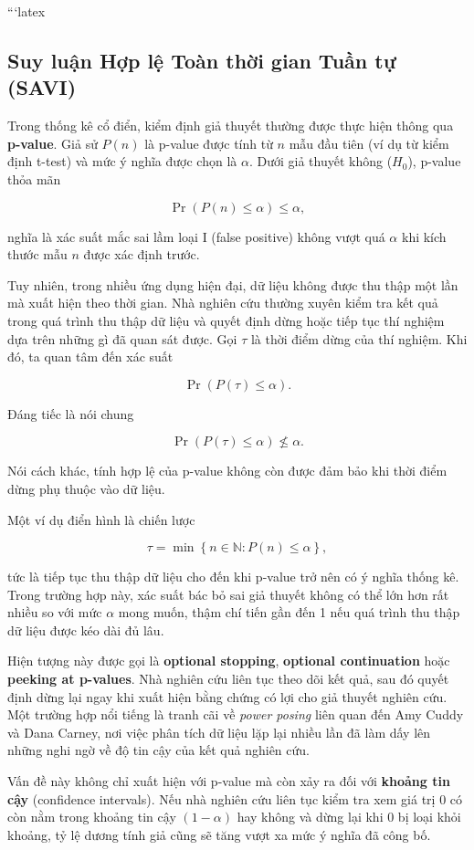 ```latex
\subsection{ Suy luận Hợp lệ Toàn thời gian Tuần tự (SAVI)}

Trong thống kê cổ điển, kiểm định giả thuyết thường được thực hiện thông qua
\textbf{p-value}. Giả sử $P(n)$ là p-value được tính từ $n$ mẫu đầu tiên
(ví dụ từ kiểm định t-test) và mức ý nghĩa được chọn là $\alpha$.
Dưới giả thuyết không ($H_0$), p-value thỏa mãn

\[
\Pr(P(n)\leq \alpha)\leq \alpha,
\]

nghĩa là xác suất mắc sai lầm loại I (false positive) không vượt quá $\alpha$
khi kích thước mẫu $n$ được xác định trước.

Tuy nhiên, trong nhiều ứng dụng hiện đại, dữ liệu không được thu thập một lần mà xuất hiện theo thời gian. Nhà nghiên cứu thường xuyên kiểm tra kết quả trong quá trình thu thập dữ liệu và quyết định dừng hoặc tiếp tục thí nghiệm dựa trên những gì đã quan sát được. Gọi $\tau$ là thời điểm dừng của thí nghiệm. Khi đó, ta quan tâm đến xác suất

\[
\Pr(P(\tau)\leq \alpha).
\]

Đáng tiếc là nói chung

\[
\Pr(P(\tau)\leq \alpha)\nleq \alpha.
\]

Nói cách khác, tính hợp lệ của p-value không còn được đảm bảo khi thời điểm dừng phụ thuộc vào dữ liệu.

Một ví dụ điển hình là chiến lược

\[
\tau
=
\min
\left\{
n\in\mathbb{N}:P(n)\leq \alpha
\right\},
\]

tức là tiếp tục thu thập dữ liệu cho đến khi p-value trở nên có ý nghĩa thống kê. Trong trường hợp này, xác suất bác bỏ sai giả thuyết không có thể lớn hơn rất nhiều so với mức $\alpha$ mong muốn, thậm chí tiến gần đến 1 nếu quá trình thu thập dữ liệu được kéo dài đủ lâu.

Hiện tượng này được gọi là \textbf{optional stopping},
\textbf{optional continuation} hoặc \textbf{peeking at p-values}.
Nhà nghiên cứu liên tục theo dõi kết quả, sau đó quyết định dừng lại ngay khi xuất hiện bằng chứng có lợi cho giả thuyết nghiên cứu. Một trường hợp nổi tiếng là tranh cãi về \textit{power posing} liên quan đến Amy Cuddy và Dana Carney, nơi việc phân tích dữ liệu lặp lại nhiều lần đã làm dấy lên những nghi ngờ về độ tin cậy của kết quả nghiên cứu.

Vấn đề này không chỉ xuất hiện với p-value mà còn xảy ra đối với \textbf{khoảng tin cậy} (confidence intervals). Nếu nhà nghiên cứu liên tục kiểm tra xem giá trị 0 có còn nằm trong khoảng tin cậy $(1-\alpha)$ hay không và dừng lại khi 0 bị loại khỏi khoảng, tỷ lệ dương tính giả cũng sẽ tăng vượt xa mức ý nghĩa đã công bố.

